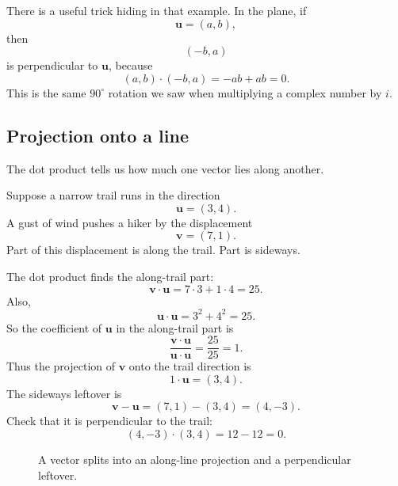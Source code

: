 There is a useful trick hiding in that example.  In the plane, if
\[
    \mathbf u=(a,b),
\]
then
\[
    (-b,a)
\]
is perpendicular to \(\mathbf u\), because
\[
    (a,b)\cdot(-b,a)
    =
    -ab+ab
    =
    0.
\]
This is the same \(90^\circ\) rotation we saw when multiplying a complex number by
\(i\).

\subsection{Projection onto a line}

The dot product tells us how much one vector lies along another.

Suppose a narrow trail runs in the direction
\[
    \mathbf u=(3,4).
\]
A gust of wind pushes a hiker by the displacement
\[
    \mathbf v=(7,1).
\]
Part of this displacement is along the trail.  Part is sideways.

The dot product finds the along-trail part:
\[
    \mathbf v\cdot\mathbf u
    =
    7\cdot3+1\cdot4
    =
    25.
\]
Also,
\[
    \mathbf u\cdot\mathbf u
    =
    3^2+4^2
    =
    25.
\]
So the coefficient of \(\mathbf u\) in the along-trail part is
\[
    \frac{\mathbf v\cdot\mathbf u}{\mathbf u\cdot\mathbf u}
    =
    \frac{25}{25}
    =
    1.
\]
Thus the projection of \(\mathbf v\) onto the trail direction is
\[
    1\cdot \mathbf u=(3,4).
\]
The sideways leftover is
\[
    \mathbf v-\mathbf u=(7,1)-(3,4)=(4,-3).
\]
Check that it is perpendicular to the trail:
\[
    (4,-3)\cdot(3,4)=12-12=0.
\]

\begin{figure}[h]
\centering
{}
\caption{A vector splits into an along-line projection and a perpendicular leftover.}
\end{figure}

